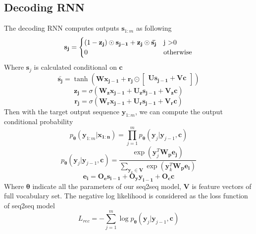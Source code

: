 \subsection{Decoding RNN}
The decoding RNN computes outputs $\mathbf{s}_{1:m}$ as following
\begin{equation}
\mathbf{s_{j}} =\begin{cases}
(1-\mathbf{z_{j}})\odot\mathbf{s_{j-1}} + \mathbf{z_{j}}\odot \mathbf{\bar{s_{j}}} & \text{j \textgreater 0}\\
0 & \text{otherwise}\\
\end{cases} 
\end{equation}
Where $\mathbf{s}_{j}$ is calculated conditional on $\mathbf{c}$
\begin{equation}
\mathbf{\bar{s_{j}}} = \tanh(\mathbf{Wx_{j-1}}+\mathbf{r_{j}}\odot\begin{bmatrix}
\mathbf{Us_{j-1}}+\mathbf{Vc}
\end{bmatrix})
\end{equation}
\begin{equation}
\mathbf{z_{j}} = \sigma(\mathbf{W_{z}x_{j-1}}+\mathbf{U_{z}s_{j-1}}+\mathbf{V_{z}c})
\end{equation}
\begin{equation}
\mathbf{r_{j}} = \sigma(\mathbf{W_{r}x_{j-1}}+\mathbf{U_{r}s_{j-1}}+\mathbf{V_{r}c})
\end{equation}
Then with the target output sequence $\mathbf{y}_{1:m}$, we can compute the output conditional probability\cite{cho2014learning}
\begin{equation}
p_{\mathbf{\theta}}(\mathbf{y}_{1:m}|\mathbf{x_{1:n}}) = \prod_{j=1}^{m} p_{\mathbf{\theta}}(\mathbf{y}_{j}|\mathbf{y}_{j-1},\mathbf{c})
\end{equation} 
\begin{equation}
p_{\mathbf{\theta}}(\mathbf{y}_{j}|\mathbf{y}_{j-1},\mathbf{c}) = \frac{\exp(\mathbf{y}_{j}^{T}\mathbf{W_{p}e_{j}} )}{\sum_{\mathbf{y}_{k} \in \mathbf{{V}}}\exp(\mathbf{y}_{k}^{T}\mathbf{W_{p}e_{i}})}
\end{equation}
\begin{equation}
\mathbf{e_{i}} = \mathbf{O_{e}s_{i-1}} + \mathbf{O_{y}y_{i-1}} + \mathbf{O_{c}c}
\end{equation}
Where $\mathbf{\theta}$ indicate all the parameters of our seq2seq model, $\mathbf{{V}}$ is feature vectors of full vocabulary set. The negative log likelihood is considered as the loss function of seq2seq model
\begin{equation}\label{eq:seq2seq-loss}
L_{rec} = -\sum_{j=1}^{m}\log p_{\mathbf{\theta}}(\mathbf{y}_{j}|\mathbf{y}_{j-1},\mathbf{c})
\end{equation}
